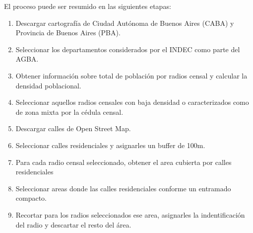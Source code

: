 El proceso puede ser resumido en las siguientes etapas:

\begin{enumerate}
	\item Descargar cartografía de Ciudad Autónoma de Buenos Aires (CABA) y Provincia de Buenos Aires (PBA).
	\item Seleccionar los departamentos considerados por el INDEC como parte del AGBA.
	\item Obtener información sobre total de población por radios censal y calcular la densidad poblacional.
	\item Seleccionar aquellos radios censales con baja densidad o caracterizados como de zona mixta por la cédula censal.
	\item Descargar calles de Open Street Map.
	\item Seleccionar calles residenciales y asignarles un buffer de 100m.
	\item Para cada radio censal seleccionado, obtener el area cubierta por calles residenciales
	\item Seleccionar areas donde las calles residenciales conforme un entramado compacto.
	\item Recortar para los radios seleccionados ese area, asignarles la indentificación del radio y descartar el resto del área.
\end{enumerate}



